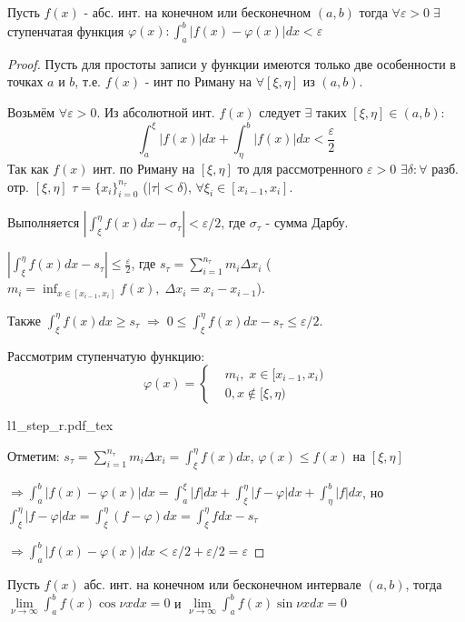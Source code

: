 \documentclass{article}
\newcommand{\incfig}[2][1]{%
    \def\svgwidth{#1\columnwidth}
    \hbox{{#2.pdf_tex}}
}
\theoremstyle{definition}
\numberwithin{theorem}{section}
\numberwithin{lemma}{section}
\numberwithin{definition}{section}
\numberwithin{corollary}{section}
\numberwithin{equation}{section}
\let\phi\varphi
\let\epsilon\varepsilon
\let\implies\Rightarrow
\begin{document}
\begin{theorem}
  Пусть $f(x)$ - абс. инт. на конечном или бесконечном $(a,b)$ тогда
  $\forall \epsilon >0 \; \exists$ ступенчатая функция $\phi(x):\int_{a}^{b}|f(x)-\phi(x)|dx<\epsilon$
\end{theorem}
\begin{proof}
  Пусть для простоты записи у функции имеются только две особенности в точках $a$ и $b$,
  т.е. $f(x)$ - инт по Риману на $\forall [\xi,\eta]$ из $(a,b)$. 

  Возьмём $\forall \epsilon>0$. Из абсолютной инт. $f(x)$ следует $\exists$ таких
  $[\xi,\eta] \in (a,b)$:
  \[
    \int_{a}^{\xi}|f(x)|dx+\int_{\eta}^{b}|f(x)|dx< \frac{\epsilon}{2}
  \]
  Так как $f(x)$ инт. по Риману на $[\xi,\eta]$ то для рассмотренного $\epsilon>0$ 
  $\exists \delta:\forall$ разб. отр. $[\xi, \eta]$ $\tau=\{x_i\}_{i=0}^{n_\tau}$
  ($|\tau|<\delta$), $\forall \xi_i \in [x_{i-1}, x_i]$.

  Выполняется $\left|\int_{\xi}^{\eta}f(x)dx-\sigma_\tau\right|<\epsilon/2$, где
  $\sigma_\tau$ - сумма Дарбу. 

  $ \left|\int_{\xi}^{\eta}f(x)dx - s_\tau\right|\le \frac{\epsilon}{2}$,
  где $s_\tau=\sum_{i=1}^{n_\tau}m_i\Delta x_i$ ($m_i=\inf_{x \in [x_{i-1},x_i]} f(x), \; \Delta x_i=x_i-x_{i-1}$).

  Также $\int_{\xi}^{\eta}f(x)dx\ge s_\tau \; \implies \; 0 \le \int_{\xi}^{\eta}f(x)dx - s_\tau \le \epsilon/2$.

  Рассмотрим ступенчатую функцию:
  \[
    \phi(x) = \left\{\begin{aligned}
       & m_i, \; x \in [x_{i-1}, x_i) \\ 
       & 0, x \notin [\xi,\eta)
    \end{aligned}\right.
  \]

  \incfig{l1_step_r}
  Отметим: $s_\tau=\sum_{i=1}^{n_\tau}m_i\Delta x_i=\int_{\xi}^{\eta}f(x)dx$, $\phi(x)\le f(x)$ на $[\xi,\eta]$

  $\implies \int_{a}^{b}|f(x)-\phi(x)|dx=\int_{a}^{\xi}|f|dx+\int_{\xi}^{\eta}|f-\phi|dx+\int_{\eta}^{b}|f|dx$,
  но $\int_{\xi}^{\eta}|f-\phi|dx=\int_{\xi}^{\eta}(f-\phi)dx=\int_{\xi}^{\eta}fdx-s_\tau$

  $\implies \int_{a}^{b}|f(x)-\phi(x)|dx<\epsilon/2+\epsilon/2=\epsilon$
\end{proof}
\begin{theorem} \label{l1_r_osc}
  Пусть $f(x)$ абс. инт. на конечном или бесконечном интервале $(a,b)$,
  тогда $\lim\limits_{\nu\to\infty}\int_{a}^{b}f(x)\cos\nu xdx=0$ и
  $\lim\limits_{\nu\to\infty}\int_{a}^{b}f(x)\sin\nu xdx=0$
\end{theorem}
\end{document}
